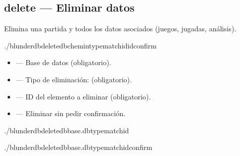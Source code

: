 \documentclass[letterpaper,10pt,spanish]{sphinxmanual}
\begin{document}
\subsection{delete — Eliminar datos}
\label{\detokenize{cli:delete-supprimer-des-donnees}}
\sphinxAtStartPar
Elimina una partida y todos los datos asociados (juegos, jugadas, análisis).

\begin{sphinxVerbatim}[commandchars=\\\{\}]
./blunderdbdelete\PYGZhy{}\PYGZhy{}db\PYGZlt{}chemin\PYGZgt{}\PYGZhy{}\PYGZhy{}typematch\PYGZhy{}\PYGZhy{}id\PYGZlt{}id\PYGZgt{}\PYG{o}{[}\PYGZhy{}\PYGZhy{}confirm\PYG{o}{]}
\end{sphinxVerbatim}

\sphinxAtStartPar
{}
\begin{itemize}
\item {} 
\sphinxAtStartPar
{} — Base de datos (obligatorio).

\item {} 
\sphinxAtStartPar
{} — Tipo de eliminación:  (obligatorio).

\item {} 
\sphinxAtStartPar
{} — ID del elemento a eliminar (obligatorio).

\item {} 
\sphinxAtStartPar
{} — Eliminar sin pedir confirmación.

\end{itemize}

\sphinxAtStartPar
{}

\begin{sphinxVerbatim}[commandchars=\\\{\}]
./blunderdbdelete\PYGZhy{}\PYGZhy{}dbbase.db\PYGZhy{}\PYGZhy{}typematch\PYGZhy{}\PYGZhy{}id

./blunderdbdelete\PYGZhy{}\PYGZhy{}dbbase.db\PYGZhy{}\PYGZhy{}typematch\PYGZhy{}\PYGZhy{}id\PYGZhy{}\PYGZhy{}confirm
\end{sphinxVerbatim}
\end{document}
